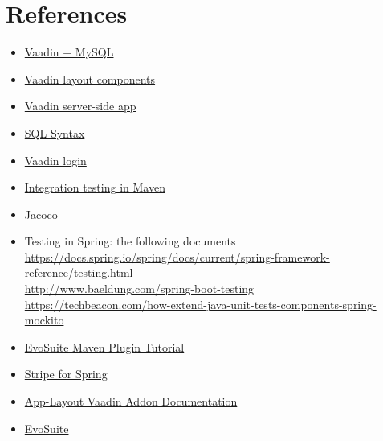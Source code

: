 \documentclass{article}
\begin{document}
\newpage
	\section{References}
\begin{itemize}
\item{}\href{https://vaadin.com/blog/building-a-web-ui-for-mysql-databases-in-plain-java-?utm_campaign=New%20registration&utm_source=hs_automation&utm_medium=email&utm_content=39610603&_hsenc=p2ANqtz--ut22Rfm32KlobpIHtq6LpH3COcrPL4sZEWDAXO1ZoRH34i0P46KUYGkVxwFIw49_cBYJPSgFVZ82j3sQ5lAAvDc8h-g&_hsmi=39610603}{Vaadin + MySQL}
\item{}\href{https://vaadin.com/docs/v8/framework/layout/layout-overview.html}{Vaadin layout components}
\item{}\href{https://vaadin.com/docs/v8/framework/application/application-overview.html}{Vaadin server-side app}
\item{}\href{https://www.w3schools.com/sql/default.asp}{SQL Syntax}
\item{}\href{https://examples.javacodegeeks.com/enterprise-java/vaadin/vaadin-login-example/}{Vaadin login}
\item{}\href{https://www.petrikainulainen.net/programming/maven/integration-testing-with-maven/}{Integration testing in Maven}
\item{}\href{https://www.petrikainulainen.net/programming/maven/creating-code-coverage-reports-for-unit-and-integration-tests-with-the-jacoco-maven-plugin/}{Jacoco}
\item{}Testing in Spring: the following documents
\\ 	\href{https://docs.spring.io/spring/docs/current/spring-framework-reference/testing.html}{https://docs.spring.io/spring/docs/current/spring-framework-reference/testing.html}
\\ 	\href{http://www.baeldung.com/spring-boot-testing}{http://www.baeldung.com/spring-boot-testing}
\\ 	\href{https://techbeacon.com/how-extend-java-unit-tests-components-spring-mockito}{https://techbeacon.com/how-extend-java-unit-tests-components-spring-mockito}
\item{}\href{http://www.evosuite.org/documentation/maven-plugin/}{EvoSuite Maven Plugin Tutorial}
\item{}\href{http://www.baeldung.com/java-stripe-api}{Stripe for Spring}
\item{}\href{https://vaadin.com/directory/component/app-layout-add-on}{App-Layout Vaadin Addon Documentation}
\item{}\href{http://www.evosuite.org/}{EvoSuite}
\end{itemize}			
\newpage
\end{document}
